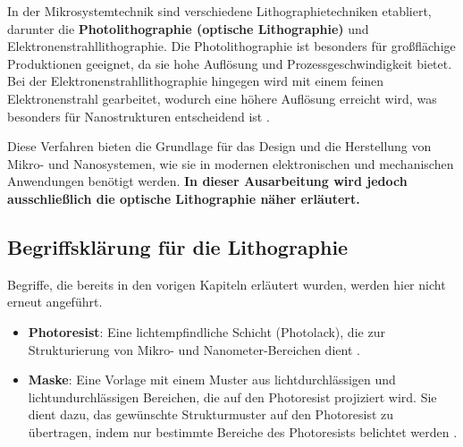 \documentclass{article} %
\begin{document}
\vspace{1em}

In der Mikrosystemtechnik sind verschiedene Lithographietechniken etabliert, darunter die \textbf{Photolithographie (optische Lithographie)} und Elektronenstrahllithographie. Die Photolithographie ist besonders für großflächige Produktionen geeignet, da sie hohe Auflösung und Prozessgeschwindigkeit bietet. Bei der Elektronenstrahllithographie hingegen wird mit einem feinen Elektronenstrahl gearbeitet, wodurch eine höhere Auflösung erreicht wird, was besonders für Nanostrukturen entscheidend ist \cite{wolf2000}.

\vspace{1em}

Diese Verfahren bieten die Grundlage für das Design und die Herstellung von Mikro- und Nanosystemen, wie sie in modernen elektronischen und mechanischen Anwendungen benötigt werden. \textbf{In dieser Ausarbeitung wird jedoch ausschließlich die optische Lithographie näher erläutert.}





\vspace{1em}

\subsection{Begriffsklärung für die Lithographie}

Begriffe, die bereits in den vorigen Kapiteln erläutert wurden, werden hier nicht erneut angeführt.

\begin{itemize}
    \item \textbf{Photoresist}: Eine lichtempfindliche Schicht (Photolack), die zur Strukturierung von Mikro- und Nanometer-Bereichen dient \cite{madou2002}.
    \item \textbf{Maske}: Eine Vorlage mit einem Muster aus lichtdurchlässigen und lichtundurchlässigen Bereichen, die auf den Photoresist projiziert wird. Sie dient dazu, das gewünschte Strukturmuster auf den Photoresist zu übertragen, indem nur bestimmte Bereiche des Photoresists belichtet werden \cite{wolf2000}.
\end{itemize}



\end{document}
